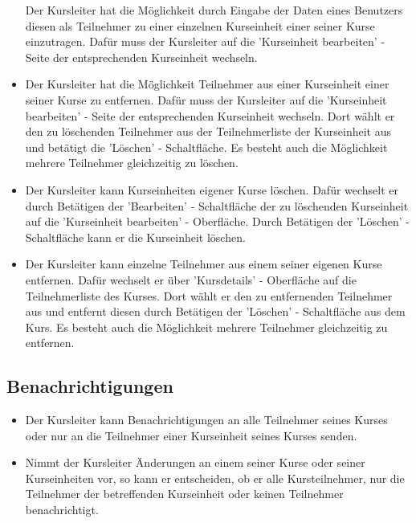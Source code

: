 \documentclass[a4paper]{scrreprt}
\begin{document}
\begin{itemize}
					Der Kursleiter hat die Möglichkeit durch Eingabe der Daten eines Benutzers diesen als Teilnehmer zu einer einzelnen Kurseinheit einer seiner Kurse einzutragen. Dafür muss der Kursleiter auf die 'Kurseinheit bearbeiten' - Seite der entsprechenden Kurseinheit wechseln.
				\item {}
				    Der Kursleiter hat die Möglichkeit Teilnehmer aus einer Kurseinheit einer seiner Kurse zu entfernen. Dafür muss der Kursleiter auf die 'Kurseinheit bearbeiten' - Seite der entsprechenden Kurseinheit wechseln. Dort wählt er den zu löschenden Teilnehmer aus der Teilnehmerliste der Kurseinheit aus und betätigt die 'Löschen' - Schaltfläche. Es besteht auch die Möglichkeit mehrere Teilnehmer gleichzeitig zu löschen.
				\item {}
					Der Kursleiter kann Kurseinheiten eigener Kurse löschen. Dafür wechselt er durch Betätigen der 'Bearbeiten' - Schaltfläche der zu löschenden Kurseinheit auf die 'Kurseinheit bearbeiten' - Oberfläche. Durch Betätigen der 'Löschen' - Schaltfläche kann er die Kurseinheit löschen.
				\item {}
					Der Kursleiter kann einzelne Teilnehmer aus einem seiner eigenen Kurse entfernen. Dafür wechselt er über 'Kursdetails' - Oberfläche auf die Teilnehmerliste des Kurses. Dort wählt er den zu entfernenden Teilnehmer aus und entfernt diesen durch Betätigen der 'Löschen' - Schaltfläche aus dem Kurs. Es besteht auch die Möglichkeit mehrere Teilnehmer gleichzeitig zu entfernen.
			\end{itemize}

		\subsection{Benachrichtigungen}
			\begin{itemize}
				\item {}
					Der Kursleiter kann Benachrichtigungen an alle Teilnehmer seines Kurses oder nur an die Teilnehmer einer Kurseinheit seines Kurses senden.
				\item {}	
					Nimmt der Kursleiter Änderungen an einem seiner Kurse oder seiner Kurseinheiten vor, so kann er entscheiden, ob er alle Kursteilnehmer, nur die Teilnehmer der betreffenden Kurseinheit oder keinen Teilnehmer benachrichtigt.
			\end{itemize}
\end{document}
